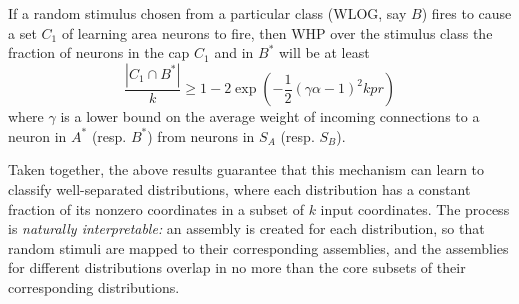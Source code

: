 \documentclass[final,12pt]{colt2022} %
\newcommand{\assmcore}[1]{{#1}^*}
\newcommand{\stimcore}[1]{S_{#1}}
\begin{document}
\begin{theorem}[Classification] \label{theorem:classify}
If a random stimulus chosen from a particular class (WLOG, say $B$) fires to cause a set $C_1$ of learning area neurons to fire, then WHP over the stimulus class the fraction of neurons in the cap $C_1$ and in $\assmcore{B}$ will be at least 
\[\frac{|C_1 \cap \assmcore{B}|}{k} \geq 1 - 2\exp\left(-\frac{1}{2}(\gamma \alpha - 1)^2 kpr \right)\]
where $\gamma$ is a lower bound on the average weight of incoming connections to a neuron in $\assmcore{A}$ (resp. $\assmcore{B}$) from neurons in $\stimcore{A}$ (resp. $\stimcore{B}$).
\end{theorem}



\noindent Taken together, the above results guarantee that this mechanism can learn to classify well-separated distributions, where each distribution has a constant fraction of its nonzero coordinates in a subset of $k$ input coordinates. The process is {\em naturally interpretable:} an assembly is created for each  distribution, so that random stimuli are mapped to their corresponding assemblies, and the assemblies for different distributions overlap in no more than the core subsets of their corresponding distributions. 
\end{document}
